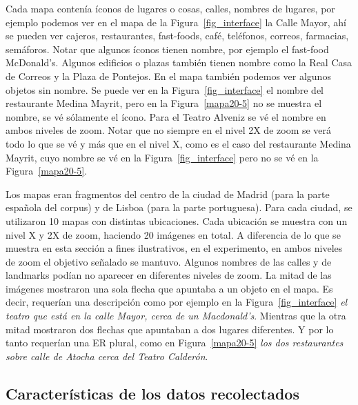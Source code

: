 Cada mapa conten\'ia \'iconos de lugares o cosas, calles, nombres de lugares, por ejemplo podemos ver en el mapa de la Figura~\ref{fig_interface} la Calle Mayor, ah\'i se pueden ver cajeros, restaurantes, fast-foods, caf\'e, tel\'efonos, correos, farmacias, sem\'aforos. Notar que algunos \'iconos tienen nombre, por ejemplo el fast-food McDonald's. Algunos edificios o plazas tambi\'en tienen nombre como la Real Casa de Correos y la Plaza de Pontejos. En el mapa tambi\'en podemos ver algunos objetos sin nombre.
Se puede ver en la Figura~\ref{fig_interface} el nombre del restaurante Medina Mayrit, pero en la Figura~\ref{mapa20-5} no se muestra el nombre, se v\'e s\'olamente el \'icono. Para el Teatro Alveniz se v\'e el nombre en ambos niveles de zoom. Notar que no siempre en el nivel 2X de zoom se ver\'a todo lo que se v\'e y m\'as que en el nivel X, como es el caso del restaurante Medina Mayrit, cuyo nombre se v\'e en la Figura~\ref{fig_interface} pero no se v\'e en la Figura~\ref{mapa20-5}.

Los mapas eran fragmentos del centro de la ciudad de Madrid (para la parte espa\~nola del corpus) y de Lisboa (para la parte portuguesa).
Para cada ciudad, se utilizaron 10 mapas con distintas ubicaciones. Cada ubicaci\'on se muestra con un nivel X y 2X de zoom, haciendo 20 im\'agenes en total. 
A diferencia de lo que se muestra en esta secci\'on a fines ilustrativos, en el experimento, en ambos niveles de zoom el objetivo se\~{n}alado se mantuvo. Algunos nombres de las calles y de landmarks pod\'{i}an no aparecer en diferentes niveles de zoom.
La mitad de las im\'agenes mostraron una sola flecha que apuntaba a un objeto en el mapa. Es decir, requer\'{i}an una descripci\'on como por ejemplo en la Figura~\ref{fig_interface} {\it el teatro que est\'a en la calle Mayor, cerca de un Macdonald's}. Mientras que la otra mitad mostraron dos flechas que apuntaban a dos lugares diferentes. Y por lo tanto requer\'ian una ER plural, como en Figura~\ref{mapa20-5} {\it los dos restaurantes sobre calle de Atocha cerca del Teatro Calder\'on}.


\subsection{Caracter\'isticas de los datos recolectados}
\label{sec:datos_recolectados}


